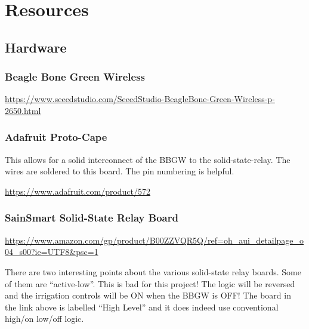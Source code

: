 %
%
%

\chapter{Resources}

\section{Hardware}

\subsection{Beagle Bone Green Wireless}

\url{https://www.seeedstudio.com/SeeedStudio-BeagleBone-Green-Wireless-p-2650.html}

\subsection{Adafruit Proto-Cape}

This allows for a solid interconnect of the BBGW to the solid-state-relay.
The wires are soldered to this board.  The pin numbering is helpful.

\url{https://www.adafruit.com/product/572}

\subsection{SainSmart Solid-State Relay Board}

\url{https://www.amazon.com/gp/product/B00ZZVQR5Q/ref=oh_aui_detailpage_o04_s00?ie=UTF8&psc=1}

There are two interesting points about the various solid-state relay boards.  
Some of them are ``active-low''.  This is bad for this project!  The logic will 
be reversed and the irrigation controls will be ON when the BBGW is OFF!  The 
board in the link above is labelled ``High Level'' and it does indeed use 
conventional high/on low/off logic.

